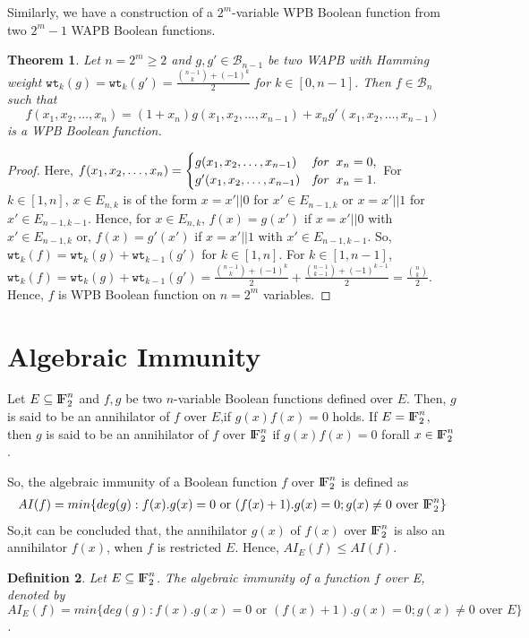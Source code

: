 \documentclass{article}[12pt]
\newtheorem{theorem}{Theorem}[section]
\newtheorem{definition}[theorem]{Definition}
\newcommand{\FF}{{\rm I\!F}}
\newcommand{\CB}{\mathcal{B}}
\newcommand{\wt}{\mathtt{wt}}
\begin{document}
 
 Similarly, we have a construction of a $2^m$-variable WPB Boolean function from two $2^m-1$ WAPB Boolean functions. 

\begin{theorem} \label{thm:WPB1}
	Let $n=2^m \geq 2$ and $g,g' \in\CB_{n-1}$ be two WAPB with Hamming weight 
	$\wt_k(g) = \wt_k(g') = \frac{{n-1 \choose k}+ (-1)^{k}}{2}$ for $k \in [0,n-1]$. Then $f \in \CB_n$ such that $$f(x_1,x_2,\ldots,x_n) = (1+x_n) g(x_1,x_2,\ldots,x_{n-1})+x_n g'(x_1,x_2,\dots,x_{n-1})$$ is a WPB Boolean function.
\end{theorem}

\begin{proof}
Here, $f(x_1,x_2,\ldots,x_n) =
	\begin{cases}
	g(x_1,x_2,\ldots, x_{n-1}) & \textit{for \;}  x_n=0, \\
	g'(x_1,x_2,\ldots, x_{n-1}) & \textit{for \;}  x_n=1.
	\end{cases}$
	For $k \in [1,n]$,  $x \in E_{n,k}$ is of the form $x = x'||0$ for $x' \in E_{n-1,k}$ or $x = x'||1$ for $x' \in E_{n-1,k-1}$.
	Hence, for $x \in E_{n,k}$, $f(x) = g(x')$ if $x = x'||0$ with $x' \in E_{n-1,k}$ or, $f(x) = g'(x')$ if $x = x'||1$ with $x' \in E_{n-1,k-1}$.
	So, $\wt_k(f) = \wt_k(g) + \wt_{k-1}(g')$ for $k \in [1,n]$.
	For $k \in [1,n-1]$, 
	$\wt_k(f) = \wt_k(g)+ \wt_{k-1}(g') = \frac{{n-1 \choose k} + (-1)^{k}}{2} + \frac{{n-1 \choose k-1} + (-1)^{k-1}}{2} = \frac{{n \choose k}}{2}$.
	Hence, $f$ is WPB Boolean function on $n = 2^m$ variables.
\end{proof}


\section{Algebraic Immunity}
Let $E \subseteq \FF_2^n$ and $f,g$ be two $n$-variable Boolean functions defined over $E$. Then, $g$ is said to be an annihilator of $f$ over $E$,if $g(x)f(x)=0$ holds. If $E=\FF_2^n$, then $g$ is said to be an annihilator of $f$ over $\FF_2^n$ if $g(x)f(x)=0$ forall $x \in \FF_2^n$.

So, the algebraic immunity of a Boolean function $f$ over $\FF_2^{n}$ is defined as
\begin{align*}
	AI(f)= min\{deg(g) : f(x).g(x)= 0 \text{ or }  (f(x)+1).g(x) = 0 ; g(x)\neq 0 \text{ over } \FF_2^n \}
\end{align*}
So,it can be concluded that, the annihilator $g(x)$ of $f(x)$ over $\FF_2^n$ is also an annihilator $f(x)$, when $f$ is restricted $E$. Hence, $AI_E (f) \leq AI(f)$.
\begin{definition}
	Let $E \subseteq \FF_2^n$. The algebraic immunity of a function $f$ over E, denoted by $AI_E (f) = min \{deg(g) : f(x).g(x)= 0 \text{ or }  (f(x)+1).g(x) = 0; g(x) \neq 0 \text{ over } E \}$. 
\end{definition}
\end{document}
